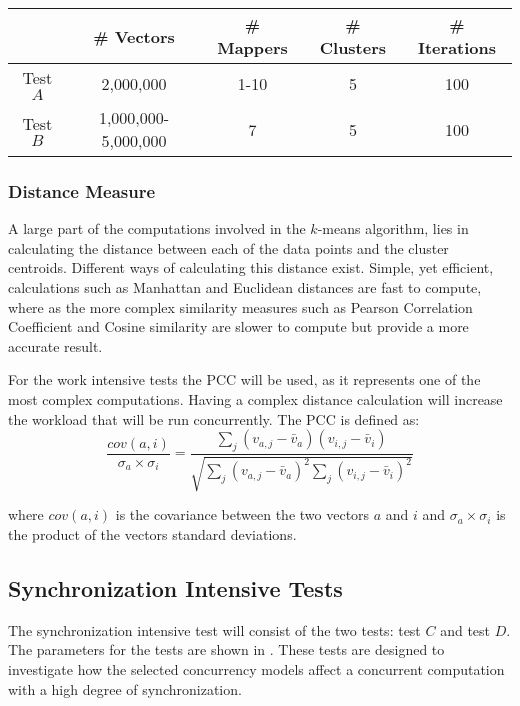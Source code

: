 \begin{center}
\begin{table}[h]
\centering
\begin{tabular}{c|cccc}
       & \# Vectors        & \# Mappers			 	& \# Clusters & \# Iterations \\ \hline
Test $A$ & 2,000,000            & 1-10        			& 5           & 100      \\
Test $B$ & 1,000,000-5,000,000  & 7          			& 5           & 100
\end{tabular}
\end{table}
 \label{tab:test_description_work_intensive} 
\end{center}

\subsubsection{Distance Measure}
A large part of the computations involved in the $k$-means algorithm, lies in calculating the distance between each of the data points and the cluster centroids. Different ways of calculating this distance exist. Simple, yet efficient, calculations such as Manhattan and Euclidean\cite[p. 41]{amatriain2011data} distances are fast to compute, where as the more complex similarity measures such as Pearson Correlation Coefficient and Cosine similarity\cite[p. 42]{amatriain2011data}\cite{breese1998empirical} are slower to compute but provide a more accurate result.

For the work intensive tests the \ac{PCC} will be used, as it represents one of the most complex computations. Having a complex distance calculation will increase the workload that will be run concurrently. The \ac{PCC} is defined as\cite[p. 4]{breese1998empirical}:
\begin{equation}\label{pearsonverbose}
\frac{cov(a,i)}{\sigma_a \times \sigma_i} = \frac{\sum_j(v_{a,j}-\bar{v}_a)(v_{i,j}-\bar{v}_i)}{\sqrt{{\sum_j}(v_{a,j}-\bar{v}_a)^2 \sum_j(v_{i,j}-\bar{v}_i)^2}}
\end{equation}

where $cov(a,i)$ is the covariance between the two vectors $a$ and $i$ and $\sigma_a \times \sigma_i$ is the product of the vectors standard deviations. 



\subsection{Synchronization Intensive Tests}
The synchronization intensive test will consist of the two tests: test $C$ and test $D$. The parameters for the tests are shown in . These tests are designed to investigate how the selected concurrency models affect a concurrent computation with a high degree of synchronization. 

